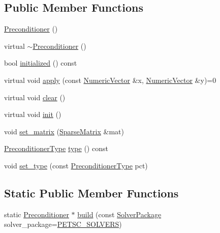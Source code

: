\subsection*{Public Member Functions}
\begin{DoxyCompactItemize}
\item 
\mbox{\hyperlink{classfemus_1_1_preconditioner_ab9aaed9f1302ee33c01ad345f1c3283e}{Preconditioner}} ()
\item 
virtual \mbox{\hyperlink{classfemus_1_1_preconditioner_a7e3ce94fa42f0ca6a5c010caaef29e70}{$\sim$\+Preconditioner}} ()
\item 
bool \mbox{\hyperlink{classfemus_1_1_preconditioner_aa1fcb677c98cfa1bca573299e06e062d}{initialized}} () const
\item 
virtual void \mbox{\hyperlink{classfemus_1_1_preconditioner_adc1601a3f6350d3a8e906fc5616578c1}{apply}} (const \mbox{\hyperlink{classfemus_1_1_numeric_vector}{Numeric\+Vector}} \&x, \mbox{\hyperlink{classfemus_1_1_numeric_vector}{Numeric\+Vector}} \&y)=0
\item 
virtual void \mbox{\hyperlink{classfemus_1_1_preconditioner_aa7827ea23c7d5c95f9fab95fb5ba3177}{clear}} ()
\item 
virtual void \mbox{\hyperlink{classfemus_1_1_preconditioner_a895100acdacfca3dde7e374c3b5c69f0}{init}} ()
\item 
void \mbox{\hyperlink{classfemus_1_1_preconditioner_a1bc0544da19e5de757d83ae2e4fb90de}{set\+\_\+matrix}} (\mbox{\hyperlink{classfemus_1_1_sparse_matrix}{Sparse\+Matrix}} \&mat)
\item 
\mbox{\hyperlink{_precondtype_enum_8hpp_a8b341faac6531c4543c9dc6e5e4592cf}{Preconditioner\+Type}} \mbox{\hyperlink{classfemus_1_1_preconditioner_a362032c26bed3a570fe8f55e17b99f61}{type}} () const
\item 
void \mbox{\hyperlink{classfemus_1_1_preconditioner_a36dfaa704ced285ca06790eecc539739}{set\+\_\+type}} (const \mbox{\hyperlink{_precondtype_enum_8hpp_a8b341faac6531c4543c9dc6e5e4592cf}{Preconditioner\+Type}} pct)
\end{DoxyCompactItemize}
\subsection*{Static Public Member Functions}
\begin{DoxyCompactItemize}
\item 
static \mbox{\hyperlink{classfemus_1_1_preconditioner}{Preconditioner}} $\ast$ \mbox{\hyperlink{classfemus_1_1_preconditioner_ae51b60e4708a8935a8f506abb7da266e}{build}} (const \mbox{\hyperlink{_solver_package_enum_8hpp_a32541e934c944770722653e69abe38fe}{Solver\+Package}} solver\+\_\+package=\mbox{\hyperlink{_solver_package_enum_8hpp_a32541e934c944770722653e69abe38fea0c85f2467c937723b91a9219b0b55399}{P\+E\+T\+S\+C\+\_\+\+S\+O\+L\+V\+E\+RS}})
\end{DoxyCompactItemize}
